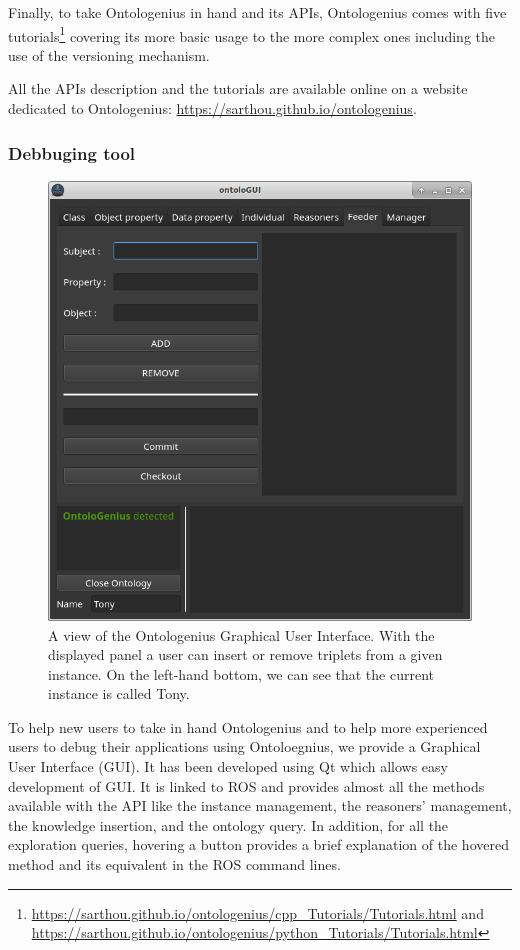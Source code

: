 Finally, to take Ontologenius in hand and its APIs, Ontologenius comes with five tutorials\footnote{\url{https://sarthou.github.io/ontologenius/cpp_Tutorials/Tutorials.html} and \url{https://sarthou.github.io/ontologenius/python_Tutorials/Tutorials.html}} covering its more basic usage to the more complex ones including the use of the versioning mechanism.

All the APIs description and the tutorials are available online on a website dedicated to Ontologenius: \url{https://sarthou.github.io/ontologenius}.

\subsubsection{Debbuging tool}

\begin{figure}[ht!]
\centering
\includegraphics[scale=0.48]{figures/chapter2/ontologui.png}
\caption{\label{fig:chap2_ontologui} A view of the Ontologenius Graphical User Interface. With the displayed panel a user can insert or remove triplets from a given instance. On the left-hand bottom, we can see that the current instance is called Tony.}
\end{figure}

To help new users to take in hand Ontologenius and to help more experienced users to debug their applications using Ontoloegnius, we provide a Graphical User Interface (GUI). It has been developed using Qt which allows easy development of GUI. It is linked to ROS and provides almost all the methods available with the API like the instance management, the reasoners' management, the knowledge insertion, and the ontology query. In addition, for all the exploration queries, hovering a button provides a brief explanation of the hovered method and its equivalent in the ROS command lines.

